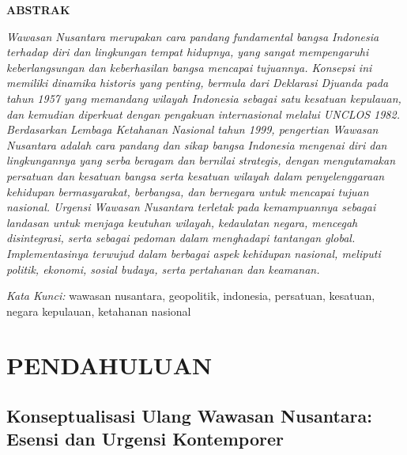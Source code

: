 \documentclass[12pt, a4paper]{article}
\newcommand{\makecustomtitle}[1]{\begin{center}\large\bfseries\fontsize{12pt}{14pt}\MakeUppercase{#1}\end{center}\vspace{0.5cm}}
\begin{document}
\makecustomtitle{ABSTRAK}
\begin{minipage}{\textwidth}
\singlespacing
\justifying
\textit{\small
Wawasan Nusantara merupakan cara pandang fundamental bangsa Indonesia terhadap diri dan lingkungan tempat hidupnya, yang sangat mempengaruhi keberlangsungan dan keberhasilan bangsa mencapai tujuannya. Konsepsi ini memiliki dinamika historis yang penting, bermula dari Deklarasi Djuanda pada tahun 1957 yang memandang wilayah Indonesia sebagai satu kesatuan kepulauan, dan kemudian diperkuat dengan pengakuan internasional melalui UNCLOS 1982. Berdasarkan \textit{Lembaga Ketahanan Nasional} tahun 1999, pengertian Wawasan Nusantara adalah cara pandang dan sikap bangsa Indonesia mengenai diri dan lingkungannya yang serba beragam dan bernilai strategis, dengan mengutamakan persatuan dan kesatuan bangsa serta kesatuan wilayah dalam penyelenggaraan kehidupan bermasyarakat, berbangsa, dan bernegara untuk mencapai tujuan nasional. Urgensi Wawasan Nusantara terletak pada kemampuannya sebagai landasan untuk menjaga keutuhan wilayah, kedaulatan negara, mencegah disintegrasi, serta sebagai pedoman dalam menghadapi tantangan global. Implementasinya terwujud dalam berbagai aspek kehidupan nasional, meliputi politik, ekonomi, sosial budaya, serta pertahanan dan keamanan.}
\vspace{0.5em}
\par\noindent
\textit{Kata Kunci:} wawasan nusantara, geopolitik, indonesia, persatuan, kesatuan, negara kepulauan, ketahanan nasional
\end{minipage}
\vspace{1cm}

\section{PENDAHULUAN}
\setlength{\parindent}{1em}
\justifying

\subsection*{Konseptualisasi Ulang Wawasan Nusantara: Esensi dan Urgensi Kontemporer}
\end{document}
